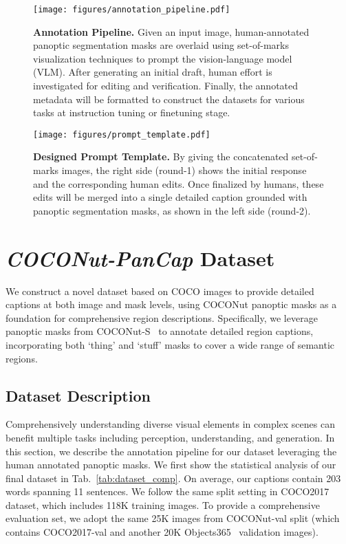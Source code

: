 \begin{figure*}[ht!]
    \centering
    \texttt{[image: figures/annotation\_pipeline.pdf]}
    \caption{\textbf{Annotation Pipeline.} Given an input image, human-annotated panoptic segmentation masks are overlaid using set-of-marks~\cite{yang2023setofmark} visualization techniques to prompt the vision-language model (VLM). After generating an initial draft, human effort is investigated for editing and verification. Finally, the annotated metadata will be formatted to construct the datasets for various tasks at instruction tuning or finetuning stage.}
    \label{fig:pipeline}
\end{figure*}

\begin{figure*}[ht!]
    \centering
    \texttt{[image: figures/prompt\_template.pdf]}
    \caption{\textbf{Designed Prompt Template.} 
    By giving the concatenated set-of-marks images, the right side (round-1) shows the initial response and the corresponding human edits. Once finalized by humans, these edits will be merged into a single detailed caption grounded with panoptic segmentation masks, as shown in the left side (round-2). 
    }
    \label{fig:template}
\end{figure*}

\section{\textit{COCONut-PanCap} Dataset }
We construct a novel dataset based on COCO images to provide detailed captions at both image and mask levels, using COCONut panoptic masks as a foundation for comprehensive region descriptions. Specifically, we leverage  panoptic masks from COCONut-S~\cite{deng2024coconut} to annotate detailed region captions, incorporating both `thing' and `stuff' masks to cover a wide range of semantic regions. 

\subsection{Dataset Description}
Comprehensively understanding diverse visual elements in complex scenes can benefit multiple tasks including perception, understanding, and generation. In this section, we describe the annotation pipeline for our dataset leveraging the human annotated panoptic masks. We first show the statistical analysis of our final dataset in Tab.~\ref{tab:dataset_comp}. On average, our captions contain 203 words spanning 11 sentences. We follow the same split setting in COCO2017~\cite{lin2014coco} dataset, which includes 118K training images.
To provide a comprehensive evaluation set, we adopt the same 25K images from COCONut-val split (which contains COCO2017-val and another 20K Objects365~\cite{shao2019objects365} validation images).




